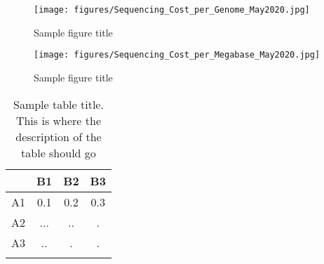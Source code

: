 \documentclass{bmcart}
\begin{document}
		
		
		\begin{figure}[h!]
			\texttt{[image: figures/Sequencing\_Cost\_per\_Genome\_May2020.jpg]}
			\caption{Sample figure title}
			\label{fig:cost_genome}
		\end{figure}
		
		\begin{figure}[h!]
			\texttt{[image: figures/Sequencing\_Cost\_per\_Megabase\_May2020.jpg]}
			\caption{Sample figure title}
			\label{fig:cost_megabase}
		\end{figure}
		
		
		\begin{table}[h!]
			\caption{Sample table title. This is where the description of the table should go}
			\begin{tabular}{cccc}
				\hline
				& B1  &B2   & B3\\ 
				\hline
				A1 & 0.1 & 0.2 & 0.3\\
				A2 & ... & ..  & .\\
				A3 & ..  & .   & .\\ 
				\hline
				\label{tab:ejemplo}
			\end{tabular}
		\end{table}
				
\end{document}
